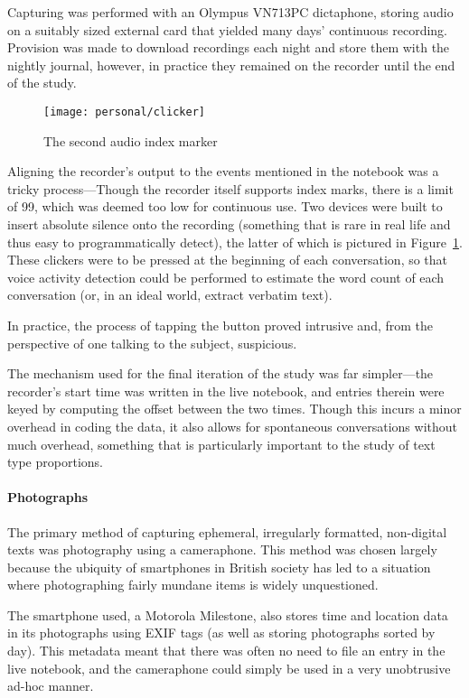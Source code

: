 Capturing was performed with an Olympus VN713PC dictaphone, storing audio on a suitably sized external card that yielded many days' continuous recording.  Provision was made to download recordings each night and store them with the nightly journal, however, in practice they remained on the recorder until the end of the study.


\begin{figure}[ht]
    \centering
    \texttt{[image: personal/clicker]}
    \caption{The second audio index marker}
    \label{fig:personal:clicker}
\end{figure}

Aligning the recorder's output to the events mentioned in the notebook was a tricky process---Though the recorder itself supports index marks, there is a limit of 99, which was deemed too low for continuous use.  Two devices were built to insert absolute silence onto the recording (something that is rare in real life and thus easy to programmatically detect), the latter of which is pictured in Figure~\ref{fig:personal:clicker}.  These clickers were to be pressed at the beginning of each conversation, so that voice activity detection could be performed to estimate the word count of each conversation (or, in an ideal world, extract verbatim text).

In practice, the process of tapping the button proved intrusive and, from the perspective of one talking to the subject, suspicious.

The mechanism used for the final iteration of the study was far simpler---the recorder's start time was written in the live notebook, and entries therein were keyed by computing the offset between the two times.  Though this incurs a minor overhead in coding the data, it also allows for spontaneous conversations without much overhead, something that is particularly important to the study of text type proportions.



\paragraph{Photographs}
The primary method of capturing ephemeral, irregularly formatted, non-digital texts was photography using a cameraphone.  This method was chosen largely because the ubiquity of smartphones in British society has led to a situation where photographing fairly mundane items is widely unquestioned.

The smartphone used, a Motorola Milestone, also stores time and location data in its photographs using EXIF tags (as well as storing photographs sorted by day).  This metadata meant that there was often no need to file an entry in the live notebook, and the cameraphone could simply be used in a very unobtrusive ad-hoc manner.

